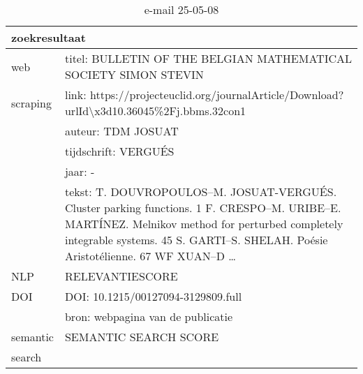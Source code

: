 \begin{table}[h!]
    \caption{e-mail 25-05-08}
    \centering
    \begin{tabularx}{\textwidth}{|p{4cm}|X|} 
        \hline
        \multicolumn{2}{|X|}{\textbf{zoekresultaat}} \\
        \hline
        web &titel: BULLETIN OF THE BELGIAN MATHEMATICAL SOCIETY SIMON STEVIN\\
        scraping&link: https://projecteuclid.org/journalArticle/Download?urlId\textbackslash x3d10.36045\%2Fj.bbms.32con1\\
        &auteur: TDM JOSUAT\\
        &tijdschrift: VERGUÉS\\
        &jaar: -\\
        &tekst: T. DOUVROPOULOS–M. JOSUAT-VERGUÉS. Cluster parking functions. 1 F. CRESPO–M. URIBE–E. MARTÍNEZ. Melnikov method for perturbed completely integrable systems. 45 S. GARTI–S. SHELAH. Poésie Aristotélienne. 67 WF XUAN–D …\\
        \hline
        NLP&RELEVANTIESCORE\\
        \hline
        DOI&DOI: 10.1215/00127094-3129809.full\\
        &bron: webpagina van de publicatie\\
        \hline
        semantic&SEMANTIC SEARCH SCORE\\
        search&\\
        \hline
    \end{tabularx}
    \label{table:email20250508}
\end{table}

